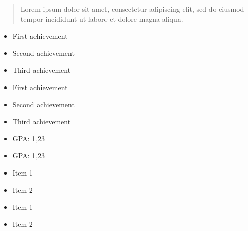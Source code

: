 \documentclass[10pt,a4paper,ragged2e,withhyper]{altacv}
\begin{document}
\begin{paracol}{2}
    \newpage

    \switchcolumn

    \begin{quote}
        Lorem ipsum dolor sit amet, consectetur adipiscing elit, sed do eiusmod tempor incididunt ut labore et dolore magna aliqua.
    \end{quote}

    \begin{itemize}
        \item First achievement
        \item Second achievement
        \item Third achievement
    \end{itemize}
    \divider

    \begin{itemize}
        \item First achievement
        \item Second achievement
        \item Third achievement
    \end{itemize}

    \begin{itemize}
        \item GPA: 1,23
    \end{itemize}
    \divider

    \begin{itemize}
        \item GPA: 1,23
    \end{itemize}

    \begin{itemize}
        \item Item 1
        \item Item 2
    \end{itemize}
    \divider

    \begin{itemize}
        \item Item 1
        \item Item 2
    \end{itemize}
\end{paracol}
\end{document}

